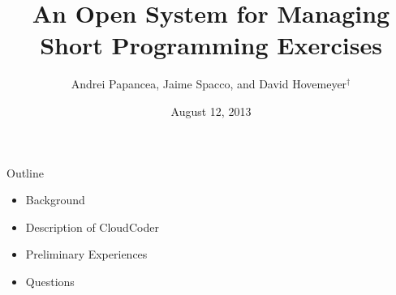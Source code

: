 \documentclass{beamer}
\begin{document}
\title[ICER 2013]{An Open System for Managing Short Programming Exercises}
\author[Papancea et.\ al.]{Andrei Papancea, Jaime Spacco, and David Hovemeyer${}^{\dagger}$}
\date[August, 2013]{August 12, 2013}

\begin{frame}[plain]
  \titlepage
\end{frame}

\begin{frame}{Outline}

\begin{itemize}
  \item Background
  \item Description of CloudCoder
  \item Preliminary Experiences
  \item Questions
\end{itemize}

\end{frame}
\end{document}
